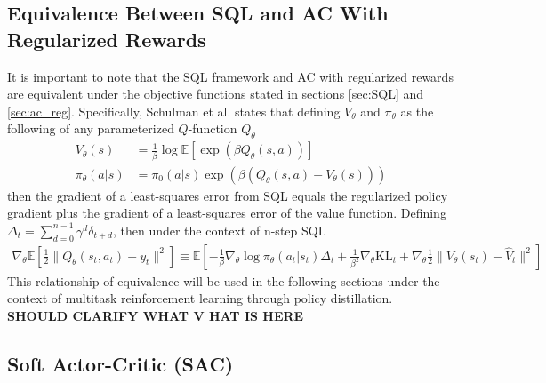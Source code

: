 \documentclass[12pt]{report}
\begin{document}
\subsection{Equivalence Between SQL and AC With Regularized Rewards}

It is important to note that the SQL framework and AC with regularized rewards are equivalent under the objective functions stated in sections \ref{sec:SQL} and \ref{sec:ac_reg}. Specifically, Schulman et al. \cite{schulman2017equivalence} states that defining $V_\theta$ and $\pi_\theta$ as the following of any parameterized $Q$-function $Q_\theta$
\begin{align}
    V_\theta(s)&=\frac{1}{\beta}\log \mathbb{E}[\exp(\beta Q_\theta(s,a))]\\
    \pi_\theta(a|s)&=\pi_0(a|s)\exp(\beta(Q_\theta(s,a)-V_\theta(s)))
\end{align}
then the gradient of a least-squares error from SQL equals the regularized policy gradient plus the gradient of a least-squares error of the value function. Defining $\Delta_t = \sum_{d=0}^{n-1} \gamma^d \delta_{t+d}$, then under the context of n-step SQL
\begin{align}
    \nabla_\theta \mathbb{E}\left[\frac{1}{2}\|Q_\theta(s_t,a_t)-y_t\|^2\right] \equiv \mathbb{E}\left[-\frac{1}{\beta}\nabla_\theta \log \pi_\theta(a_t|s_t)\Delta_t + {\frac{1}{\beta^2}} \nabla_\theta \text{KL}_t + \nabla_\theta \frac{1}{2}\|V_\theta(s_t)-\hat{V}_t\|^2
    \right]
\end{align}
This relationship of equivalence will be used in the following sections under the context of multitask reinforcement learning through policy distillation.
\textbf{SHOULD CLARIFY WHAT V HAT IS HERE}
\subsection{Soft Actor-Critic (SAC)}
\end{document}
